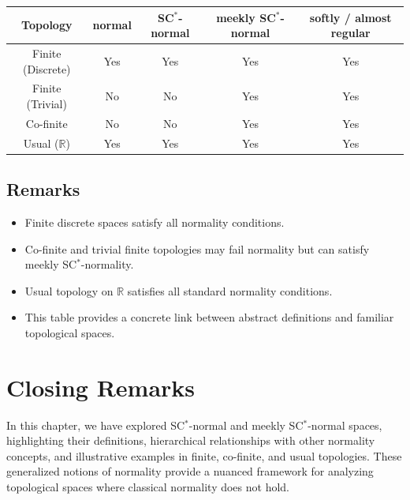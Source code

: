 \documentclass[12pt,a4paper,twoside]{report}  %
\theoremstyle{plain}
\theoremstyle{definition}
\begin{document}
\begin{center}
\begin{tabular}{|c|c|c|c|c|}
\hline
Topology & normal & SC$^*$-normal & meekly SC$^*$-normal & softly / almost regular \\ \hline
Finite (Discrete) & Yes & Yes & Yes & Yes \\ \hline
Finite (Trivial) & No & No & Yes & Yes \\ \hline
Co-finite & No & No & Yes & Yes \\ \hline
Usual ($\mathbb{R}$) & Yes & Yes & Yes & Yes \\ \hline
\end{tabular}
\end{center}

\subsection{Remarks}
\begin{itemize}
    \item Finite discrete spaces satisfy all normality conditions.
    \item Co-finite and trivial finite topologies may fail normality but can satisfy meekly SC$^*$-normality.
    \item Usual topology on $\mathbb{R}$ satisfies all standard normality conditions.
    \item This table provides a concrete link between abstract definitions and familiar topological spaces.
\end{itemize}





\section*{Closing Remarks}

In this chapter, we have explored SC$^*$-normal and meekly SC$^*$-normal spaces, highlighting their definitions, hierarchical relationships with other normality concepts, and illustrative examples in finite, co-finite, and usual topologies. These generalized notions of normality provide a nuanced framework for analyzing topological spaces where classical normality does not hold.  
\end{document}
